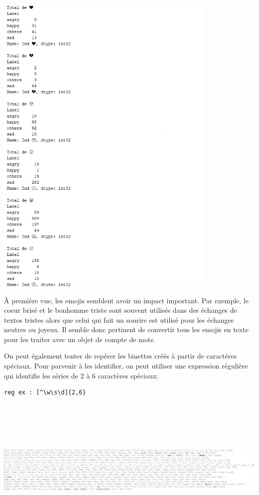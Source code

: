 \documentclass[12pt,french]{article}
\begin{document}
\includegraphics[width=\linewidth,height=15cm,keepaspectratio]{analyse_emojis}

À première vue, les emojis semblent avoir un impact important. Par exemple, le coeur brisé et le bonhomme triste sont souvent utilisés dans des échanges de textos tristes alors que celui qui fait un sourire est utilisé pour les échanges neutres ou joyeux. Il semble donc pertinent de convertir tous les emojis en texte pour les traiter avec un objet de compte de mots.

On peut également tenter de repérer les binettes créés à partir de caractères spéciaux. Pour parvenir à les identifier, on peut utiliser une expression régulière qui identifie les séries de 2 à 6 caractères spéciaux:
\begin{verbatim}
reg ex : [^\w\s\d]{2,6}
\end{verbatim}

\includegraphics[width=\linewidth,height=7cm]{analyse_list_car_speciaux}
\end{document}
